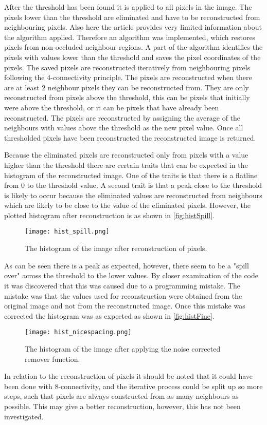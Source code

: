 After the threshold has been found it is applied to all pixels in the image. The pixels lower than the threshold are eliminated and have to be reconstructed from neighbouring pixels. Also here the article provides very limited information about the algorithm applied. Therefore an algorithm was implemented, which restores pixels from non-occluded neighbour regions. A part of the algorithm identifies the pixels with values lower than the threshold and saves the pixel coordinates of the pixels. The saved pixels are  reconstructed iteratively from neighbouring pixels following the 4-connectivity principle. The pixels are reconstructed when there are at least 2 neighbour pixels they can be reconstructed from. They are only reconstructed from pixels above the threshold, this can be pixels that initially were above the threshold, or it can be pixels that have already been reconstructed. The pixels are reconstructed by assigning the average of the neighbours with values above the threshold as the new pixel value. Once all thresholded pixels have been reconstructed the reconstructed image is returned.

Because the eliminated pixels are reconstructed only from pixels with a value higher than the threshold there are certain traits that can be expected in the histogram of the reconstructed image. One of the traits is that there is a flatline from 0 to the threshold value. A second trait is that a peak close to the threshold is likely to occur because the eliminated values are reconstructed from neighbours which are likely to be close to the value of the eliminated pixels. However, the plotted histogram after reconstruction is as shown in \autoref{fig:histSpill}.
\begin{figure}[h]
\centering
\texttt{[image: hist\_spill.png]}
\caption{The histogram of the image after reconstruction of pixels.}
\label{fig:histSpill}
\end{figure}
As can be seen there is a peak as expected, however, there seem to be a "spill over" across the threshold to the lower values. By closer examination of the code it was discovered that this was caused due to a programming mistake. The mistake was that the values used for reconstruction were obtained from the original image and not from the reconstructed image. Once this mistake was corrected the histogram was as expected as shown in \autoref{fig:histFine}. 
\begin{figure}[h]
\centering
\texttt{[image: hist\_nicespacing.png]}
\caption{The histogram of the image after applying the noise corrected remover function.}
\label{fig:histFine}
\end{figure}
In relation to the reconstruction of pixels it should be noted that it could have been done with 8-connectivity, and the iterative process could be split up so more steps, such that pixels are always constructed from as many neighbours as possible. This may give a better reconstruction, however, this has not been investigated. 
